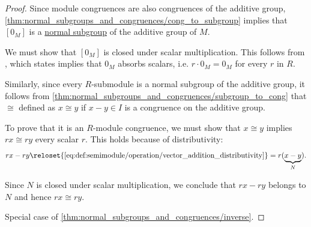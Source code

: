 \begin{proof}
   Since module congruences are also congruences of the additive group, \cref{thm:normal_subgroups_and_congruences/cong_to_subgroup} implies that \( [0_M] \) is a \hyperref[def:normal_subgroup]{normal subgroup} of the additive group of \( M \).

  We must show that \( [0_M] \) is closed under scalar multiplication. This follows from , which states implies that \( 0_M \) absorbs scalars, i.e. \( r \cdot 0_M = 0_M \) for every \( r \) in \( R \).

   Similarly, since every \( R \)-submodule is a normal subgroup of the additive group, it follows from \cref{thm:normal_subgroups_and_congruences/subgroup_to_cong} that \( {\cong} \) defined as \( x \cong y \) if \( x - y \in I \) is a congruence on the additive group.

  To prove that it is an \( R \)-module congruence, we must show that \( x \cong y \) implies \( rx \cong ry \) every scalar \( r \). This holds because of distributivity:
  \begin{equation*}
    rx - ry
    \reloset {\eqref{eq:def:semimodule/operation/vector_addition_distributivity}} =
    r(\underbrace{x - y}_{N}).
  \end{equation*}

  Since \( N \) is closed under scalar multiplication, we conclude that \( rx - ry \) belongs to \( N \) and hence \( rx \cong ry \).

   Special case of \cref{thm:normal_subgroups_and_congruences/inverse}.
\end{proof}

